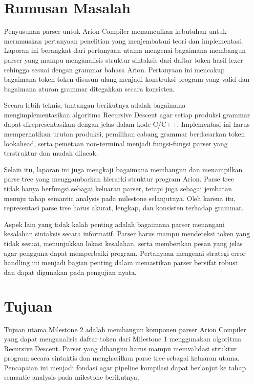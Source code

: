 \section{Rumusan Masalah}
Penyusunan parser untuk Arion Compiler memunculkan kebutuhan untuk merumuskan pertanyaan 
penelitian yang menjembatani teori dan implementasi. Laporan ini berangkat dari pertanyaan 
utama mengenai bagaimana membangun parser yang mampu menganalisis struktur sintaksis dari 
daftar token hasil lexer sehingga sesuai dengan grammar bahasa Arion. Pertanyaan ini mencakup 
bagaimana token-token disusun ulang menjadi konstruksi program yang valid dan bagaimana aturan 
grammar ditegakkan secara konsisten.

Secara lebih teknis, tantangan berikutnya adalah bagaimana mengimplementasikan algoritma 
Recursive Descent agar setiap produksi grammar dapat direpresentasikan dengan jelas 
dalam kode C/C++. Implementasi ini harus memperhatikan urutan produksi, pemilihan 
cabang grammar berdasarkan token lookahead, serta pemetaan non-terminal menjadi 
fungsi-fungsi parser yang terstruktur dan mudah dilacak.

Selain itu, laporan ini juga mengkaji bagaimana membangun dan menampilkan parse 
tree yang menggambarkan hierarki struktur program Arion. Parse tree tidak hanya 
berfungsi sebagai keluaran parser, tetapi juga sebagai jembatan menuju tahap semantic 
analysis pada milestone selanjutnya. Oleh karena itu, representasi parse tree harus 
akurat, lengkap, dan konsisten terhadap grammar.

Aspek lain yang tidak kalah penting adalah bagaimana parser menangani kesalahan 
sintaksis secara informatif. Parser harus mampu mendeteksi token yang tidak sesuai, 
menunjukkan lokasi kesalahan, serta memberikan pesan yang jelas agar pengguna dapat 
memperbaiki program. Pertanyaan mengenai strategi error handling ini menjadi bagian 
penting dalam memastikan parser bersifat robust dan dapat digunakan pada pengujian nyata.

\section{Tujuan}
Tujuan utama Milestone 2 adalah membangun komponen parser Arion Compiler yang dapat 
menganalisis daftar token dari Milestone 1 menggunakan algoritma Recursive Descent. 
Parser yang dibangun harus mampu memvalidasi struktur program secara sintaktis dan 
menghasilkan parse tree sebagai keluaran utama. Pencapaian ini menjadi fondasi agar 
pipeline kompilasi dapat berlanjut ke tahap semantic analysis pada milestone berikutnya.

